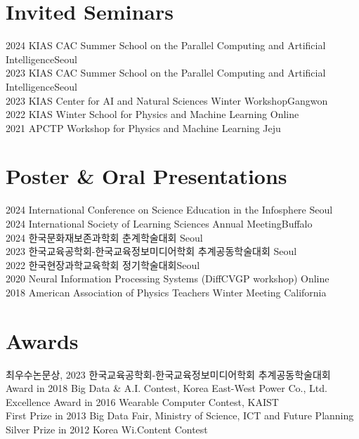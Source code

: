 \documentclass[margin,line]{res}
\begin{document}
\begin{resume}
\section{\sc Invited \phantom{MM} Seminars}
2024 KIAS CAC Summer School on the Parallel Computing and Artificial Intelligence\hfill Seoul\\
2023 KIAS CAC Summer School on the Parallel Computing and Artificial Intelligence\hfill Seoul\\
2023 KIAS Center for AI and Natural Sciences Winter Workshop\hfill Gangwon\\
2022 KIAS Winter School for Physics and Machine Learning \hfill Online\\
2021 APCTP Workshop for Physics and Machine Learning \hfill Jeju\\


\section{\sc Poster \& Oral Presentations}
2024 International Conference on Science Education in the Infosphere \hfill Seoul\\
2024 International Society of Learning Sciences Annual Meeting\hfill Buffalo\\
2024 한국문화재보존과학회 춘계학술대회 \hfill Seoul\\
2023 한국교육공학회-한국교육정보미디어학회 추계공동학술대회 \hfill Seoul\\
2022 한국현장과학교육학회 정기학술대회\hfill Seoul\\
2020 Neural Information Processing Systems (DiffCVGP workshop)  \hfill Online\\
2018 American Association of Physics Teachers Winter Meeting \hfill California\\

\section{\sc Awards}

최우수논문상, 2023 한국교육공학회-한국교육정보미디어학회 추계공동학술대회 \\
Award in 2018 Big Data \& A.I. Contest, Korea East-West Power Co., Ltd.\\
Excellence Award in 2016 Wearable Computer Contest, KAIST\\
First Prize in 2013 Big Data Fair, Ministry of Science, ICT and Future Planning\\
Silver Prize in 2012 Korea Wi.Content Contest



\end{resume}
\end{document}
